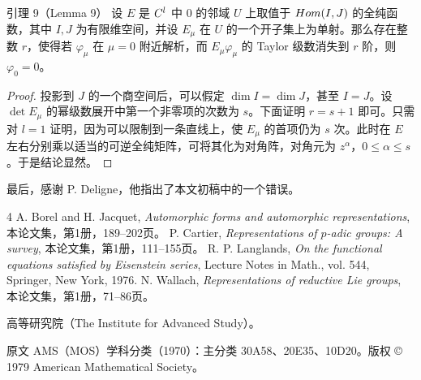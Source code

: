 \begin{originaltheorem}{引理 9（Lemma 9）}
设 $E$ 是 $C^l$ 中 $0$ 的邻域 $U$ 上取值于 $Hom(I,J)$ 的全纯函数，其中 $I,J$ 为有限维空间，并设 $E_\mu$ 在 $U$ 的一个开子集上为单射。那么存在整数 $r$，使得若 $\varphi_\mu$ 在 $\mu=0$ 附近解析，而 $E_\mu\varphi_\mu$ 的 Taylor 级数消失到 $r$ 阶，则 $\varphi_0=0$。
\end{originaltheorem}
\begin{proof}
投影到 $J$ 的一个商空间后，可以假定 $\dim I=\dim J$，甚至 $I=J$。设 $\det E_\mu$ 的幂级数展开中第一个非零项的次数为 $s$。下面证明 $r=s+1$ 即可。只需对 $l=1$ 证明，因为可以限制到一条直线上，使 $E_\mu$ 的首项仍为 $s$ 次。此时在 $E$ 左右分别乘以适当的可逆全纯矩阵，可将其化为对角阵，对角元为 $z^\alpha$，$0\leq\alpha\leq s$。于是结论显然。
\end{proof}
最后，感谢 P. Deligne，他指出了本文初稿中的一个错误。

\begin{thebibliography}{4}
 A. Borel and H. Jacquet, \emph{Automorphic forms and automorphic representations}, 本论文集，第1册，189--202页。
 P. Cartier, \emph{Representations of $p$-adic groups: A survey}, 本论文集，第1册，111--155页。
 R. P. Langlands, \emph{On the functional equations satisfied by Eisenstein series}, Lecture Notes in Math., vol. 544, Springer, New York, 1976.
 N. Wallach, \emph{Representations of reductive Lie groups}, 本论文集，第1册，71--86页。
\end{thebibliography}
\noindent 高等研究院（The Institute for Advanced Study）。

\noindent\footnotesize 原文 AMS（MOS）学科分类（1970）：主分类 30A58、20E35、10D20。版权 © 1979 American Mathematical Society。\normalsize
